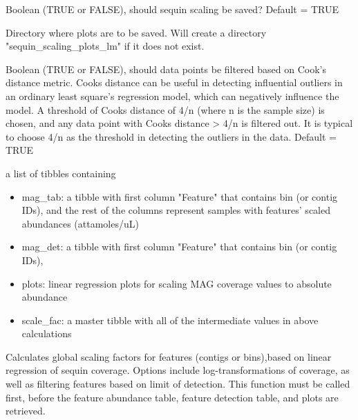 \documentclass[a4paper]{book}
\begin{document}
\begin{Arguments}
\begin{ldescription}
\item[\code{save\_plots}] Boolean (TRUE or FALSE), should sequin scaling be saved? Default = TRUE

\item[\code{plot\_dir}] Directory where plots are to be saved. Will create a directory "sequin\_scaling\_plots\_lm" if it does not exist.

\item[\code{cook\_filtering}] Boolean (TRUE or FALSE), should data points be filtered based on Cook's distance metric. Cooks distance can be useful in detecting influential outliers in an ordinary least square’s regression model, which can negatively influence the model. A threshold of Cooks distance of 4/n (where n is the sample size) is chosen, and any data point with Cooks distance > 4/n is filtered out. It is typical to choose 4/n as the threshold in detecting the outliers in the data. Default = TRUE
\end{ldescription}
\end{Arguments}
%
\begin{Value}
a list of tibbles containing
\begin{itemize}

\item{} mag\_tab: a tibble with first column "Feature" that contains bin (or contig IDs), and the rest of the columns represent samples with features' scaled abundances (attamoles/uL)
\item{} mag\_det: a tibble with first column "Feature" that contains bin (or contig IDs),
\item{} plots: linear regression plots for scaling MAG coverage values to absolute abundance
\item{} scale\_fac: a master tibble with all of the intermediate values in above calculations

\end{itemize}

\end{Value}
%
\begin{Description}\relax
Calculates global scaling factors for features (contigs or bins),based on linear regression of sequin coverage. Options include log-transformations of coverage, as well as filtering features based on limit of detection. This function must be called first, before the feature abundance table, feature detection table, and plots are retrieved.
\end{Description}
\end{document}
